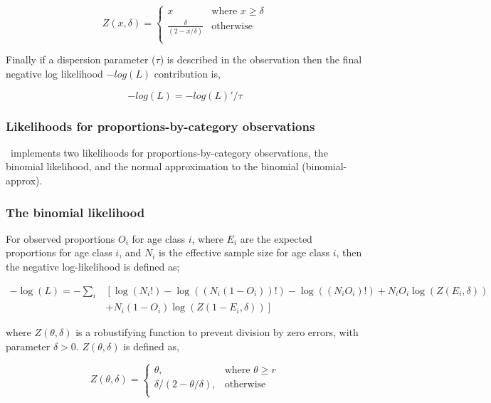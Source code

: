 {{{{\[ Z(x,\delta) =
\begin{cases}
x       & \text{where } x \geq \delta\\
\frac{\delta}{(2 - x / \delta)}  & \text{otherwise}\\
\end{cases}
\]

Finally if a dispersion parameter ($\tau$) is described in the observation then the final negative log likelihood $-log(L)$ contribution is,

$$-log(L) = -log(L)' / \tau$$


\subsubsection{Likelihoods for proportions-by-category observations}
\CNAME\ implements two likelihoods for proportions-by-category observations, the binomial likelihood, and the normal approximation to the binomial (binomial-approx). 

\subsubsection*{The binomial likelihood}

For observed proportions $O_i$ for age class $i$, where $E_i$ are the expected proportions for age class $i$, and $N_i$ is the effective sample size for age class $i$, then the negative log-likelihood is defined as;  

\begin{equation}
\begin{split}
-\log \left(L \right)= -\sum\limits_i & \left[ \right. \log \left(N_i! \right) - \log \left(\left(N_i \left(1 - O_i \right) \right)! \right) - \log \left(\left(N_i O_i \right)! \right) + N_i O_i \log \left(Z\left(E_i,\delta \right) \right) \\
&+ N_i \left(1 - O_i \right)\log \left(Z\left(1 - E_i,\delta\right) \right) \left. \right]
\end{split}
\end{equation}


where $Z \left(\theta,\delta \right)$ is a robustifying function to prevent division by zero errors, with parameter $\delta>0$. $Z \left(\theta,\delta \right)$ is defined as,

\begin{equation}
Z \left(\theta,\delta \right) = \begin{cases}
\theta, & \text{where $\theta \ge r$} \\
\delta/\left( 2-\theta/\delta \right), & \text{otherwise} \\  
\end{cases}
\end{equation}

}}}}
